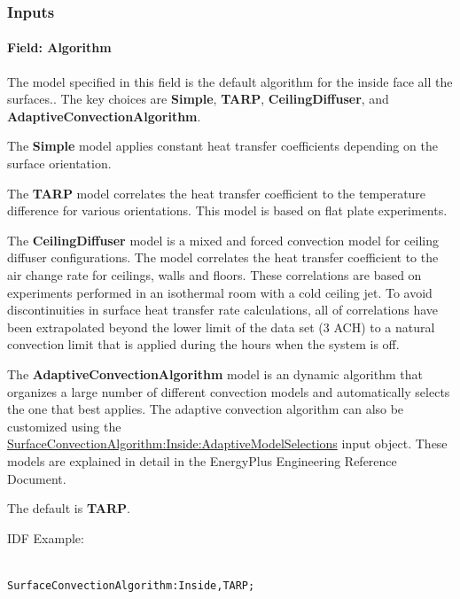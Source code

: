 \subsubsection{Inputs}\label{inputs-4-031}

\paragraph{Field: Algorithm}\label{field-algorithm-000}

The model specified in this field is the default algorithm for the inside face all the surfaces.. The key choices are \textbf{Simple}, \textbf{TARP}, \textbf{CeilingDiffuser}, and \textbf{AdaptiveConvectionAlgorithm}.

The \textbf{Simple} model applies constant heat transfer coefficients depending on the surface orientation.

The \textbf{TARP} model correlates the heat transfer coefficient to the temperature difference for various orientations. This model is based on flat plate experiments.

The \textbf{CeilingDiffuser} model is a mixed and forced convection model for ceiling diffuser configurations. The model correlates the heat transfer coefficient to the air change rate for ceilings, walls and floors. These correlations are based on experiments performed in an isothermal room with a cold ceiling jet. To avoid discontinuities in surface heat transfer rate calculations, all of correlations have been extrapolated beyond the lower limit of the data set (3 ACH) to a natural convection limit that is applied during the hours when the system is off.

The \textbf{AdaptiveConvectionAlgorithm} model is an dynamic algorithm that organizes a large number of different convection models and automatically selects the one that best applies. The adaptive convection algorithm can also be customized using the \hyperref[surfaceconvectionalgorithminsideadaptivemodelselections]{SurfaceConvectionAlgorithm:Inside:AdaptiveModelSelections} input object. These models are explained in detail in the EnergyPlus Engineering Reference Document.

The default is \textbf{TARP}.

IDF Example:

\begin{lstlisting}

SurfaceConvectionAlgorithm:Inside,TARP;
\end{lstlisting}

